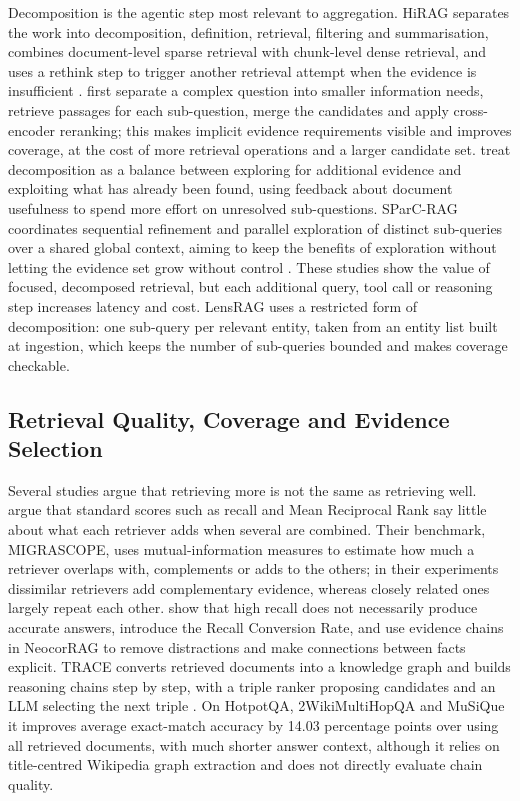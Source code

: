 \documentclass[11pt,letterpaper,oneside]{report}
\begin{document}
Decomposition is the agentic step most relevant to aggregation. HiRAG
separates the work into decomposition, definition, retrieval, filtering and
summarisation, combines document-level sparse retrieval with chunk-level
dense retrieval, and uses a rethink step to trigger another retrieval attempt
when the evidence is insufficient \citep{zhang2024hirag}.
\citet{ammann2025decomposition} first separate a complex question into
smaller information needs, retrieve passages for each sub-question, merge the
candidates and apply cross-encoder reranking; this makes implicit evidence
requirements visible and improves coverage, at the cost of more retrieval
operations and a larger candidate set. \citet{petcu2026exploration} treat
decomposition as a balance between exploring for additional evidence and
exploiting what has already been found, using feedback about document
usefulness to spend more effort on unresolved sub-questions. SParC-RAG
coordinates sequential refinement and parallel exploration of distinct
sub-queries over a shared global context, aiming to keep the benefits of
exploration without letting the evidence set grow without control
\citep{yang2026sparcrag}. These studies show the value of focused,
decomposed retrieval, but each additional query, tool call or reasoning step
increases latency and cost. LensRAG uses a restricted form of decomposition:
one sub-query per relevant entity, taken from an entity list built at
ingestion, which keeps the number of sub-queries bounded and makes coverage
checkable.

\subsection{Retrieval Quality, Coverage and Evidence Selection}
Several studies argue that retrieving more is not the same as retrieving
well. \citet{zheng2026migrascope} argue that standard scores such as recall and
Mean Reciprocal Rank say little about what each retriever adds when several
are combined. Their benchmark, MIGRASCOPE, uses mutual-information measures
to estimate how much a retriever overlaps with, complements or adds to the
others; in their experiments dissimilar retrievers add complementary
evidence, whereas closely related ones largely repeat each other. \citet{peng2026neocorrag} show that
high recall does not necessarily produce accurate answers, introduce the
Recall Conversion Rate, and use evidence chains in NeocorRAG to remove
distractions and make connections between facts explicit. TRACE converts
retrieved documents into a knowledge graph and builds reasoning chains step by
step, with a triple ranker proposing candidates and an LLM selecting the next
triple \citep{fang2024trace}. On HotpotQA, 2WikiMultiHopQA and MuSiQue it
improves average exact-match accuracy by 14.03 percentage points over using
all retrieved documents, with much shorter answer context, although it relies
on title-centred Wikipedia graph extraction and does not directly evaluate
chain quality.
\end{document}
